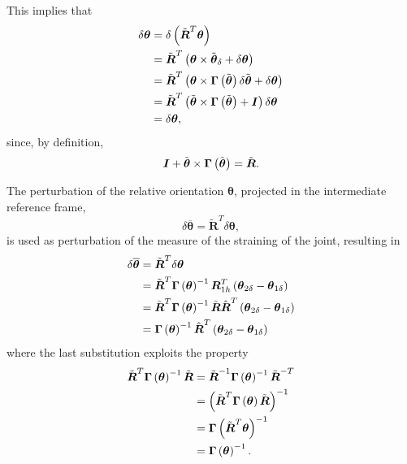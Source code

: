 \documentclass[10pt,dvips,fleqn]{report}
\newcommand{\T}[1]{\boldsymbol{#1}}
\begin{document}
This implies that
\begin{align}
	\delta\T{\theta}
	&= \delta\plbr{\tilde{\T{R}}^T \T{\theta}}
	\nonumber \\
	&= \tilde{\T{R}}^T \plbr{
		\T{\theta} \times \tilde{\T{\theta}}_{\delta}
		+ \delta\T{\theta}
	}
	\nonumber \\
	&= \tilde{\T{R}}^T \plbr{
		\T{\theta} \times \T{\Gamma}\plbr{\tilde{\T{\theta}}} \delta\tilde{\T{\theta}}
		+ \delta\T{\theta}
	}
	\nonumber \\
	&= \tilde{\T{R}}^T \plbr{
		\tilde{\T{\theta}} \times \T{\Gamma}\plbr{\tilde{\T{\theta}}}
		+ \T{I}
	} \delta\T{\theta}
	\nonumber \\
	&= \delta\T{\theta} ,
\end{align}
since, by definition,
\begin{equation}
	\T{I} + \tilde{\T{\theta}} \times \T{\Gamma}\plbr{\tilde{\T{\theta}}} = \tilde{\T{R}} .
\end{equation}

The perturbation of the relative orientation $\T{\theta}$, 
projected in the intermediate reference frame,
\begin{equation}
	\delta\overline{\T{\theta}} = \tilde{\T{R}}^T \delta\T{\theta} ,
\end{equation}
is used as perturbation of the measure of the straining of the joint,
resulting in
\begin{align}
	\delta\overline{\T{\theta}}
	&= \tilde{\T{R}}^T \delta\T{\theta}
	\nonumber \\
	&= \tilde{\T{R}}^T \T{\Gamma}\plbr{\T{\theta}}^{-1} \T{R}_{1h}^T \plbr{\T{\theta}_{2\delta} - \T{\theta}_{1\delta}}
	\nonumber \\
	&= \tilde{\T{R}}^T \T{\Gamma}\plbr{\T{\theta}}^{-1} \tilde{\T{R}} \hat{\T{R}}^T \plbr{\T{\theta}_{2\delta} - \T{\theta}_{1\delta}}
	\nonumber \\
	&= \T{\Gamma}\plbr{\T{\theta}}^{-1} \hat{\T{R}}^T \plbr{\T{\theta}_{2\delta} - \T{\theta}_{1\delta}}
\end{align}
where the last substitution exploits the property
\begin{align}
	\tilde{\T{R}}^T \T{\Gamma}\plbr{\T{\theta}}^{-1} \tilde{\T{R}}
	&= \tilde{\T{R}}^{-1} \T{\Gamma}\plbr{\T{\theta}}^{-1} \tilde{\T{R}}^{-T} 
	\nonumber \\
	&= \plbr{
		\tilde{\T{R}}^T \T{\Gamma}\plbr{\T{\theta}} \tilde{\T{R}}
	}^{-1} 
	\nonumber \\
	&= \T{\Gamma}\plbr{\tilde{\T{R}}^T \T{\theta}}^{-1} 
	\nonumber \\
	&= \T{\Gamma}\plbr{\T{\theta}}^{-1} .
\end{align}
\end{document}
